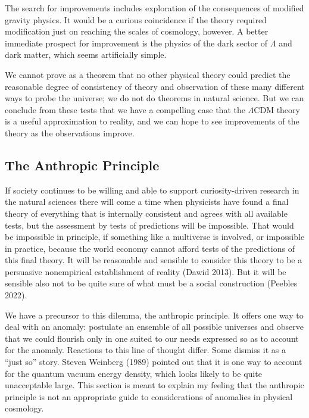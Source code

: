 \documentclass[fleqn,usenatbib]{mnras}
\begin{document}
The search for improvements includes exploration of the consequences of modified gravity physics. It would be a curious coincidence if the theory required modification just on reaching the scales of cosmology, however. A better immediate prospect for improvement is the physics of the dark sector of $\Lambda$ and dark matter, which seems artificially simple. 

We cannot prove as a theorem that no other physical theory could predict the reasonable degree of consistency of theory and observation of these many different ways to probe the universe; we do not do theorems in natural science. But we can conclude from these tests that we have a compelling case that the $\Lambda$CDM theory is a useful approximation to reality, and we can hope to see improvements of the theory as the observations improve. 

\subsection{The Anthropic Principle}\label{sec:Anthropic}

If society continues to be willing and able to support curiosity-driven research in the natural sciences there will come a time when physicists have found a final theory of everything that is internally consistent and agrees with all available tests, but the assessment by tests of predictions will be impossible. That would be impossible in principle, if something like a multiverse is involved, or impossible in practice, because the world economy cannot afford tests of the predictions of this final theory. It will be reasonable and sensible  to consider this theory to be a persuasive nonempirical establishment of reality (Dawid 2013). But it will be sensible also not to be quite sure of what must be a social construction (Peebles 2022). 

We have a precursor to this dilemma, the anthropic principle. It offers one way to deal with an anomaly: postulate an ensemble of all possible universes and observe that we could flourish only in one suited to our needs expressed so as to account for the anomaly. Reactions to this line of thought differ. Some dismiss it as a ``just so'' story. Steven Weinberg (1989) pointed out that it is one way to account for the quantum vacuum energy density, which looks likely to be quite unacceptable large. This section is meant to explain my feeling that the anthropic principle is not an appropriate guide to considerations of anomalies in physical cosmology. 
\end{document}
